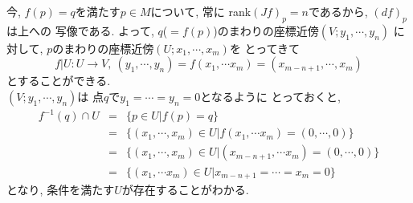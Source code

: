 \documentclass[dvipdfmx,cjk]{beamer}
\theoremstyle{definition}
\begin{document}
\begin{frame}
  \frametitle{}
    今, $f(p)=q$を満たす$p\in M$について, 常に
    rank$(Jf)_p=n$であるから, $(df)_p$は上への
    写像である. よって, 
    $q$($=f(p)$)のまわりの座標近傍$(V;y_1,\cdots ,y_n)$
    に対して, 
    $p$のまわりの座標近傍$(U;x_1,\cdots ,x_m)$を
    とってきて
    $$f|U:U\to V,\ (y_1,\cdots ,y_n)=f(x_1,\cdots x_m)
    =(x_{m-n+1},\cdots ,x_m)$$
    とすることができる.  \\
    $(V;y_1,\cdots ,y_n)$は
    点$q$で$y_1=\cdots =y_n=0$となるように
    とっておくと, 
    \begin{eqnarray*}
        f^{-1}(q)\cap U&=& \{p\in U|f(p)=q\}\\
        &=&\{(x_1,\cdots ,x_m)\in U|f(x_1,\cdots x_m)=(0,\cdots ,0)\}\\
        &=&\{(x_1,\cdots ,x_m)\in U|(x_{m-n+1},\cdots x_m)=(0,\cdots ,0)\}\\
        &=&\{(x_1,\cdots x_m)\in U|x_{m-n+1}=\cdots =x_m=0\}
    \end{eqnarray*}
    となり, 条件を満たす$U$が存在することがわかる. 
\end{frame}
\end{document}
